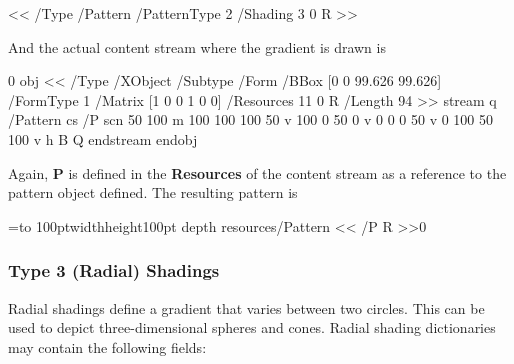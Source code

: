\blisting
<<
    /Type /Pattern  %
    /PatternType 2  %
    /Shading 3 0 R  %
>> 
\elisting

\noindent And the actual content stream where the gradient is drawn is

 0 obj
<<
/Type /XObject
/Subtype /Form
/BBox [0 0 99.626 99.626]
/FormType 1
/Matrix [1 0 0 1 0 0]
/Resources 11 0 R
/Length 94        
>>
stream
q
/Pattern cs
/P scn
50 100 m
100 100 100 50 v 100 0 50 0 v 0 0 0 50 v 0 100 50 100 v %
h
B                                                       %
Q 
endstream
endobj
\elisting

\noindent Again, {\bf P} is defined in the {\bf Resources} of the content stream as a reference to the pattern
object defined.
The resulting pattern is

\immediate{}

\immediate{}

\immediate{}

\bgroup
{}=\hbox to 100pt{\vrule width\z@ height100pt depth\z@%
}
\pdfxform resources{/Pattern << /P \the\pdflastobj{} R >>}0

\centerline{\pdfrefxform\pdflastxform}
\egroup

\subsubsection{Type 3 (Radial) Shadings}

Radial shadings define a gradient that varies between two circles.
This can be used to depict three-dimensional spheres and cones.
Radial shading dictionaries may contain the following fields:

